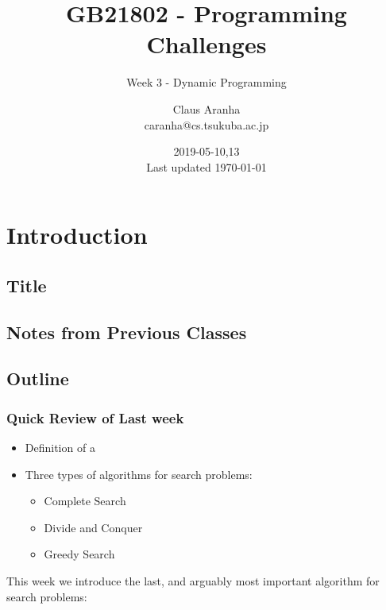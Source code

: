 \documentclass{beamer}
\title[GB21802]{GB21802 - Programming Challenges}
\subtitle[]{Week 3 - Dynamic Programming}
\author[Claus Aranha]{Claus Aranha\\{\footnotesize caranha@cs.tsukuba.ac.jp}}
\institute{College of Information Science}
\date{2019-05-10,13\\{\tiny Last updated \today}}
\begin{document}
\section{Introduction}
\subsection{Title}
\begin{frame}
\maketitle
\end{frame}

\subsection{Notes from Previous Classes}



\subsection{Outline}

\begin{frame}
  \frametitle{Quick Review of Last week}
  \begin{itemize}
  \item Definition of a 
  \item Three types of algorithms for search problems:
    \begin{itemize}
    \item Complete Search
    \item Divide and Conquer
    \item Greedy Search
    \end{itemize}
  \end{itemize}

  \bigskip

  \begin{block}{}
    This week we introduce the last, and arguably most important
    algorithm for search problems: 
  \end{block}
\end{frame}
\end{document}
